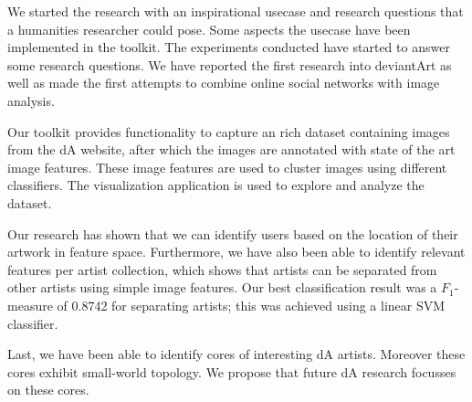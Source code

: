 We started the research with an inspirational usecase and research questions that a humanities researcher could pose.
Some aspects the usecase have been implemented in the toolkit. The experiments conducted have started to answer some research questions.
We have reported the first research into deviantArt as well as made the first attempts to combine online social networks with image analysis.

Our toolkit provides functionality to capture an rich dataset containing images from the dA website, after which the images are annotated with state of the art image features. These image features are used to cluster images using different classifiers. The visualization application is used to explore and analyze the dataset.

Our research has shown that we can identify users based on the location of their artwork in feature space. Furthermore, we have also been able to identify relevant features per artist collection, which shows that artists can be separated from other artists using simple image features. Our best classification result was a $F_1$-measure of 0.8742 for separating artists; this was achieved using a linear SVM classifier.

Last, we have been able to identify cores of interesting dA artists. Moreover these cores exhibit small-world topology. We propose that future dA research focusses on these cores.

